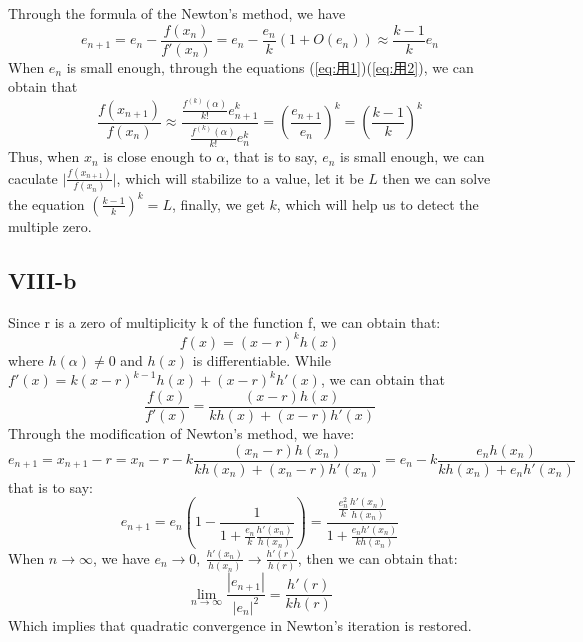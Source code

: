 \documentclass[a4paper]{article}
\begin{document}
Through the formula of the Newton's method, we have
\begin{equation}
    e_{n+1}=e_n-\frac{f(x_n)}{f'(x_n)}=e_n-\frac{e_n}{k}(1+O(e_n))\approx \frac{k-1}{k}e_n
\end{equation}
When $e_n$ is small enough, through the equations (\ref{eq:用1})(\ref{eq:用2}), we can obtain that
\begin{equation}
    \frac{f(x_{n+1})}{f(x_n)}\approx \frac{\frac{f^{(k)}(\alpha)}{k!}e_{n+1}^k}{\frac{f^{(k)}(\alpha)}{k!}e_{n}^k}=(\frac{e_{n+1}}{e_n})^k=(\frac{k-1}{k})^k
\end{equation}
Thus, when $x_n$ is close enough to $\alpha$, that is to say, $e_n$ is small enough, we can caculate $\big|\frac{f(x_{n+1})}{f(x_n)}\big|$, which will stabilize to a value, let it be $L$ then we can solve the equation $(\frac{k-1}{k})^k = L$, finally, we get $k$, which will help us to detect the multiple zero.

\subsection*{VIII-b}
Since r is a zero of multiplicity k of the function f, we can obtain that:
\begin{equation}
    f(x)=(x-r)^k h(x)
\end{equation}
where $h(\alpha)\neq 0$ and $h(x)$ is differentiable. While $f'(x)=k(x-r)^{k-1}h(x)+(x-r)^kh'(x)$, we can obtain that
\begin{equation}
    \frac{f(x)}{f'(x)}=\frac{(x-r)h(x)}{kh(x)+(x-r)h'(x)}
\end{equation}
Through the modification of Newton's method, we have:
\begin{equation}
    e_{n+1}=x_{n+1}-r=x_{n}-r-k\frac{(x_n-r)h(x_n)}{kh(x_n)+(x_n-r)h'(x_n)}=e_n-k\frac{e_nh(x_n)}{kh(x_n)+e_nh'(x_n)}
\end{equation}
that is to say:
\begin{equation}
    e_{n+1}=e_n(1-\frac{1}{1+\frac{e_n}{k}\frac{h'(x_n)}{h(x_n)}})=\frac{\frac{e_n^2}{k}\frac{h'(x_n)}{h(x_n)}}{1+\frac{e_nh'(x_n)}{kh(x_n)}}
\end{equation}
When $n\to \infty$, we have $e_n\to 0,\ \frac{h'(x_n)}{h(x_n)}\to\frac{h'(r)}{h(r)}$, then we can obtain that:
\begin{equation}
    \lim_{n\to \infty}\frac{|e_{n+1}|}{|e_n|^2}=\frac{h'(r)}{kh(r)}
\end{equation}
Which implies that quadratic convergence in Newton's iteration is restored.
\end{document}
